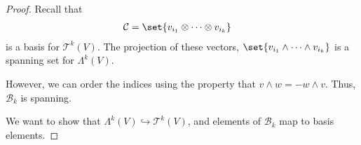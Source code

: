 \documentclass[10pt]{mypackage}
\begin{document}
    \begin{proof}
      Recall that
      \begin{align*}
        \mathcal{C} &= \set{v_{i_1}\otimes\cdots\otimes v_{i_k}}
      \end{align*}
      is a basis for $\mathcal{T}^{k}\left(V\right)$. The projection of these vectors, $\set{v_{i_1}\wedge\cdots\wedge v_{i_k}}$ is a spanning set for $\Lambda^{k}\left(V\right)$.\newline

      However, we can order the indices using the property that $v\wedge w = -w\wedge v$. Thus, $\mathcal{B}_k$ is spanning.\newline

      We want to show that $\Lambda^{k}\left(V\right) \hookrightarrow \mathcal{T}^{k}\left(V\right)$, and elements of $\mathcal{B}_k$ map to basis elements.\newline


\end{proof}
\end{document}
